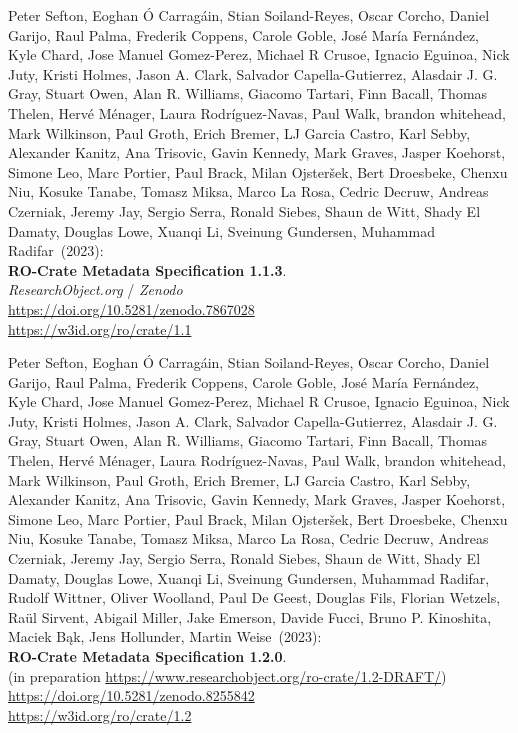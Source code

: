 \begin{thebibliography}{9}
Peter Sefton, Eoghan Ó Carragáin, Stian Soiland-Reyes, Oscar
Corcho, Daniel Garijo, Raul Palma, Frederik Coppens, Carole Goble, José
María Fernández, Kyle Chard, Jose Manuel Gomez-Perez, Michael R Crusoe,
Ignacio Eguinoa, Nick Juty, Kristi Holmes, Jason A. Clark, Salvador
Capella-Gutierrez, Alasdair J. G. Gray, Stuart Owen, Alan R. Williams,
Giacomo Tartari, Finn Bacall, Thomas Thelen, Hervé Ménager, Laura
Rodríguez-Navas, Paul Walk, brandon whitehead, Mark Wilkinson, Paul
Groth, Erich Bremer, LJ Garcia Castro, Karl Sebby, Alexander Kanitz, Ana
Trisovic, Gavin Kennedy, Mark Graves, Jasper Koehorst, Simone Leo, Marc
Portier, Paul Brack, Milan Ojsteršek, Bert Droesbeke, Chenxu Niu, Kosuke Tanabe, Tomasz Miksa, Marco La Rosa, Cedric Decruw, Andreas Czerniak, Jeremy Jay, Sergio Serra, Ronald Siebes, Shaun de Witt, Shady El Damaty, Douglas Lowe, Xuanqi Li, Sveinung Gundersen, Muhammad Radifar~(2023):\\
\textbf{RO-Crate Metadata Specification 1.1.3}.\\
\emph{ResearchObject.org} / \emph{Zenodo}\\
\url{https://doi.org/10.5281/zenodo.7867028}\\
\url{https://w3id.org/ro/crate/1.1}

Peter Sefton, Eoghan Ó Carragáin, Stian Soiland-Reyes, Oscar
Corcho, Daniel Garijo, Raul Palma, Frederik Coppens, Carole Goble, José
María Fernández, Kyle Chard, Jose Manuel Gomez-Perez, Michael R Crusoe,
Ignacio Eguinoa, Nick Juty, Kristi Holmes, Jason A. Clark, Salvador
Capella-Gutierrez, Alasdair J. G. Gray, Stuart Owen, Alan R. Williams,
Giacomo Tartari, Finn Bacall, Thomas Thelen, Hervé Ménager, Laura
Rodríguez-Navas, Paul Walk, brandon whitehead, Mark Wilkinson, Paul
Groth, Erich Bremer, LJ Garcia Castro, Karl Sebby, Alexander Kanitz, Ana
Trisovic, Gavin Kennedy, Mark Graves, Jasper Koehorst, Simone Leo, Marc
Portier, Paul Brack, Milan Ojsteršek, Bert Droesbeke, Chenxu Niu, Kosuke Tanabe, Tomasz Miksa, Marco La Rosa, Cedric Decruw, Andreas Czerniak, Jeremy Jay, Sergio Serra, Ronald Siebes, Shaun de Witt, Shady El Damaty, Douglas Lowe, Xuanqi Li, Sveinung Gundersen, Muhammad Radifar,
Rudolf Wittner, Oliver Woolland, Paul De Geest, Douglas Fils, Florian Wetzels, Raül Sirvent,
Abigail Miller, Jake Emerson, Davide Fucci, Bruno P. Kinoshita, Maciek Bąk,
Jens Hollunder, Martin Weise~(2023):\\
\textbf{RO-Crate Metadata Specification 1.2.0}.\\
(in preparation \url{https://www.researchobject.org/ro-crate/1.2-DRAFT/})\\
\url{https://doi.org/10.5281/zenodo.8255842}\\
\url{https://w3id.org/ro/crate/1.2}


\end{thebibliography}

